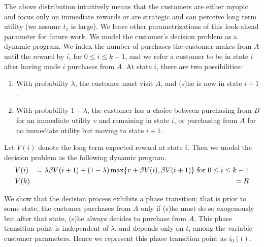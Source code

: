 The above distribution intuitively means that the customers are either myopic and focus only on immediate rewards or are strategic and can perceive long term utility (we assume $t_1$ is large).
We leave other parametrizations of this look-ahead parameter for future work.
We model the customer's decision problem as a dynamic program. 
We index the number of purchases the customer makes from $A$ until the reward by $i$, for $0 \leq i \leq k-1$, and we refer a customer to be in state $i$ after having made $i$ purchases from $A$. 
At state $i$, there are two possibilities:
\begin{enumerate}
\item
With probability $\lambda$, the customer must visit $A$, and (s)he is now in state $i+1$.
\item
With probability $1-\lambda$, the customer has a choice between purchasing from $B$ for an immediate utility $v$ and remaining in state $i$, or purchasing from $A$ for no immediate utility but moving to state $i+1$.
\end{enumerate}

Let $V(i)$ denote the long term expected reward at state $i$. Then we model the decision problem as the following dynamic program.
\begin{eqnarray}
& V(i) & = \lambda \beta V(i+1) + (1-\lambda)\max\{v+\beta V(i),\beta V(i+1) \} \mbox{ for } 0\leq i \leq k-1 \label{eq:dp_form}\\
& V(k) & = R \notag
\end{eqnarray}

We show that the decision process exhibits a phase transition; that is prior to some state, the customer purchases from $A$ only if (s)he must do so exogenously but after that state, (s)he always decides to purchase from $A$. 
This phase transition point is independent of $\lambda$, and depends only on $t$, among the variable customer parameters.
Hence we represent this phase transition point as $i_0(t)$.

